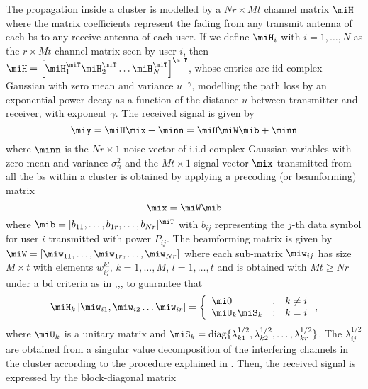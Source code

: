 The propagation inside a cluster is modelled by a $Nr\times Mt$ channel matrix $\miH$ where the matrix coefficients represent the fading from any transmit antenna of each \gls{bs} to any receive antenna of each user. If we define $\miH_i$ with $i=1,\dots, N$ as the
$r\times Mt$ channel matrix seen by user $i$, then $\miH=\left[\miH_1^\miT\miH_2^\miT\dots\miH_N^\miT\right]^\miT$, whose entries are iid complex Gaussian with zero mean and variance $u^{-\gamma}$, modelling the path loss by an exponential power decay as a function of the distance $u$ between transmitter and receiver, with exponent $\gamma$.
The received signal is given by 
\begin{equation}
    \miy=\miH\mix+ \minn =\miH\miW\mib+ \minn \label{eq:yHxn}
\end{equation}
where $\minn$ is the $Nr\times 1$ noise vector of i.i.d complex Gaussian variables with zero-mean and variance $\sigma_n^2$ and 
the $Mt\times 1$ signal vector $\mix$ transmitted from all the \gls{bs} within a cluster is obtained by applying a precoding (or beamforming) matrix
\begin{equation}
    \mix= \miW\mib
\end{equation}
where $\mib=[b_{11},\dots,b_{1r},\dots,b_{Nr}]^\miT$ with $b_{ij}$ representing the $j$-th data symbol for user $i$ transmitted with
power $P_{ij}$. The beamforming matrix is given by $\miW=[\miw_{11},\dots,\miw_{1r},\dots,\miw_{Nr}]$ where each sub-matrix
$\miw_{ij}$ has size $M \times t$ with elements $w_{ij}^{kl}$, $k=1,\ldots, M$, $l=1,\ldots, t$
and is obtained with $Mt\geq Nr$ under a \gls{bd} criteria as in \cite{karakayali06},\cite{armada11b},\cite{shim08}, to guarantee that
\begin{equation}
\label{eq:3}
\begin{split}
     &\miH_k \left[\miw_{i1},\miw_{i2}\dots \miw_{ir}\right]
         =\left \{\begin{array}{lcl}\mi0 &: & k\neq i\\ \miU_k\miS_k &: & k=i \end{array}\right .,\\
\end{split}
\end{equation}
where $\miU_k$ is a unitary matrix and
$\miS_k=\text{diag}\{\lambda_{k1}^{1/2},\lambda_{k2}^{1/2},\dots,\lambda_{kr}^{1/2}\}$.
The $\lambda_{ij}^{1/2}$ are obtained from a singular value decomposition of the interfering channels in the cluster according to the procedure explained in \cite{armada11b}. Then, the received signal is expressed by the block-diagonal matrix
